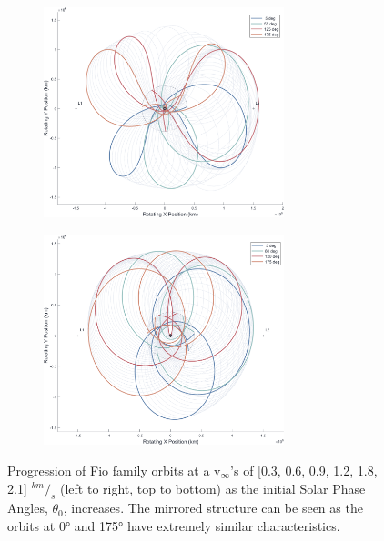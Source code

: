 \documentclass[letterpaper, paper,11pt]{AAS}	%
\begin{document}
\begin{figure}[h!]
    \begin{subfigure}{}
        \includegraphics[trim=75 50 0 0, clip, width=2.75in]{./figs/sunrot_ThetaPlot_io_famF_vInf1.8.png}
    \end{subfigure}
    \begin{subfigure}{}
        \includegraphics[trim=75 50 0 0, clip, width=2.75in]{./figs/sunrot_ThetaPlot_io_famF_vInf2.1.png}
    \end{subfigure}
    \caption{Progression of Fio family orbits at a v\(_\infty\)'s of [0.3, 0.6, 0.9, 1.2, 1.8, 2.1] \(^{km}/_s\) (left to right, top to bottom) as the initial Solar Phase Angles, \(\theta_0\), increases. The mirrored structure can be seen as the orbits at 0° and 175° have extremely similar characteristics.}
    \label{fig:sunrot_thetaPlot_io_F_2.1}
\end{figure}

\clearpage





\end{document}
